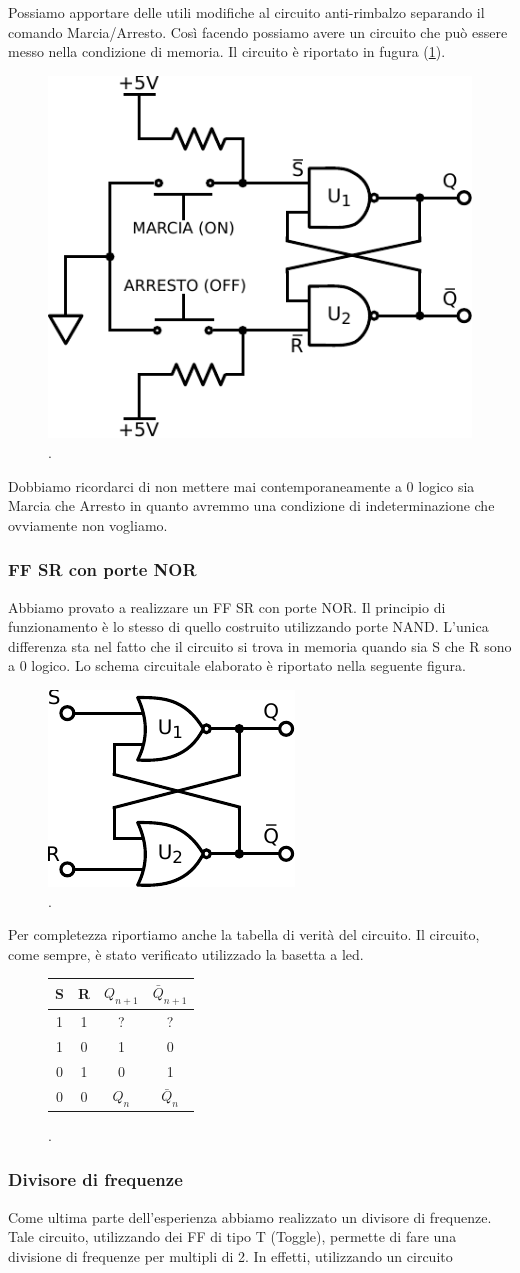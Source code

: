 Possiamo apportare delle utili modifiche al circuito anti-rimbalzo separando il comando Marcia/Arresto. Così facendo possiamo avere un circuito che può essere messo nella condizione di memoria. Il circuito è riportato in fugura (\ref{cir11:marcia}).

\begin{figure}[H]
\centering
\includegraphics[width=.25\textwidth]{../E11/latex/motorefermo.pdf}
\caption{.}
\label{cir11:marcia}
\end{figure}

Dobbiamo ricordarci di non mettere mai contemporaneamente a 0 logico sia Marcia che Arresto in quanto avremmo una condizione di indeterminazione che ovviamente non vogliamo.


\subsubsection*{FF SR con porte NOR}

Abbiamo provato a realizzare un FF SR con porte NOR. Il principio di funzionamento è lo stesso di quello costruito utilizzando porte NAND. L'unica differenza sta nel fatto che il circuito si trova in memoria quando sia S che R sono a 0 logico. Lo schema circuitale elaborato è riportato nella seguente figura.

\begin{figure}[H]
\centering
\includegraphics[width=.25\textwidth]{../E11/latex/FF-w-NOR.pdf}
\caption{.}
\label{cir11:nor}
\end{figure}

Per completezza riportiamo anche la tabella di verità del circuito. Il circuito, come sempre, è stato verificato utilizzado la basetta a led.

\begin{figure}[H]
		\centering
		{\renewcommand{\arraystretch}{1.1}%
		\begin{tabular}{c|c|c|c}
		S & R & $Q_{n+1}$ & $\bar Q_{n+1}$  \\
		\hline
		1 & 1  & ?&?\\
		\hline
		1&0 & 1 & 0\\
		\hline
		0&1 & 0  &1\\
		\hline
		0&0 & $Q_n$ & $\bar Q_n$\\
		\end{tabular}}
		\label{tab11:nor}
		\caption{.}
        \end{figure}


\subsubsection*{Divisore di frequenze}

Come ultima parte dell'esperienza abbiamo realizzato un divisore di frequenze. Tale circuito, utilizzando dei FF di tipo T (Toggle), permette di fare una divisione di frequenze per multipli di 2. In effetti, utilizzando un circuito 



